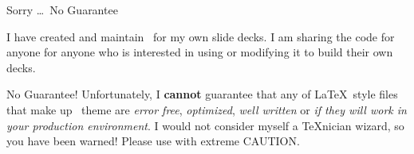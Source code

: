 \documentclass[\string~/GitHub/sthlmNordBeamerTheme/sthlmNordLightDemo.tex]{subfiles}
\begin{document}
\begin{frame}[c]{Sorry \ldots\ No Guarantee}

	I have created and maintain \snord\ for my own slide decks.  I am sharing the
	code for anyone for anyone who is interested in using or modifying it to build
	their own decks.

	\vspace{1em}

	\begin{alertblock}{No Guarantee!}
		Unfortunately, I \textbf{cannot} guarantee that any of \LaTeX\ style files that make up
		\snord\ theme are \emph{error free}, \emph{optimized}, \emph{well written} or
		\emph{if they will work in your production environment}.  I would not consider
		myself a \TeX nician wizard, so you have been warned!  Please use with extreme
		\alert{CAUTION}.
	\end{alertblock}


\end{frame}
\end{document}
